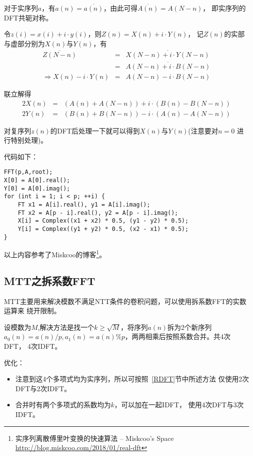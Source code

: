对于实序列$a$，有$a(n)=\overline{a(n)}$，由此可得$\overline{A(n)}=A(N-n)$，
即实序列的DFT共轭对称。

令$z(i)=x(i)+i\cdot y(i)$，则$Z(n)=X(n)+i\cdot Y(n)$，
记$Z(n)$的实部与虚部分别为$X(n)$与$Y(n)$，有
\begin{eqnarray*}
	\overline{Z(N-n)}&=&\overline{X(N-n)+i\cdot Y(N-n)}\\
	&=&\overline{A(N-n)+i\cdot B(N-n)}\\
	\Rightarrow X(n)-i\cdot Y(n)&=&A(N-n)-i\cdot B(N-n)
\end{eqnarray*}

联立解得
\begin{eqnarray*}
	2X(n)&=&(A(n)+A(N-n))+i\cdot (B(n)-B(N-n))\\
	2Y(n)&=&(B(n)+B(N-n))-i\cdot (A(n)-A(N-n))
\end{eqnarray*}

对复序列$z(n)$的DFT后处理一下就可以得到$X(n)$与$Y(n)$(注意要对$n=0$
进行特别处理)。

代码如下：
\begin{lstlisting}
FFT(p,A,root);
X[0] = A[0].real();
Y[0] = A[0].imag();
for (int i = 1; i < p; ++i) {
	FT x1 = A[i].real(), y1 = A[i].imag();
	FT x2 = A[p - i].real(), y2 = A[p - i].imag();
	X[i] = Complex((x1 + x2) * 0.5, (y1 - y2) * 0.5);
	Y[i] = Complex((y1 + y2) * 0.5, (x2 - x1) * 0.5);
}
\end{lstlisting}

以上内容参考了Miskcoo的博客\footnote{实序列离散傅里叶变换的快速算法 – Miskcoo's Space
\url{http://blog.miskcoo.com/2018/01/real-dft}}。
\subsection{MTT之拆系数FFT}
MTT主要用来解决模数不满足NTT条件的卷积问题，可以使用拆系数FFT的实数运算来
绕开限制。

设模数为$M$,解决方法是找一个$k\geq\sqrt{M}$，将序列$a(n)$拆为2个新序列
$a_0(n)=a(n)/p,a_1(n)=a(n)\% p$，两两相乘后按照系数合并。共4次DFT，
4次IDFT。

优化：
\begin{itemize}
	\item 注意到这4个多项式均为实序列，所以可按照~\ref{RDFT}节中所述方法
	仅使用2次DFT与2次IDFT。
	\item 合并时有两个多项式的系数均为$k$，可以加在一起IDFT，
	使用4次DFT与3次IDFT。
\end{itemize}
